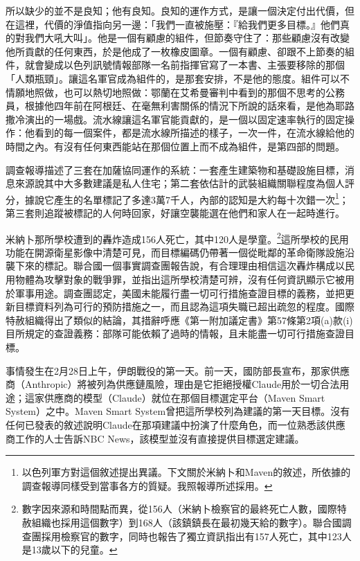 所以缺少的並不是良知；他有良知。良知的運作方式，是讓一個決定付出代價，但在這裡，代價的淨值指向另一邊：「我們一直被施壓：『給我們更多目標。』他們真的對我們大吼大叫」\autocite{abraham2024lavender}。他是一個有顧慮的組件，但節奏守住了：那些顧慮沒有改變他所貢獻的任何東西，於是他成了一枚橡皮圖章。一個有顧慮、卻跟不上節奏的組件，就會變成以色列訊號情報部隊一名前指揮官寫了一本書、主張要移除的那個「人類瓶頸」\autocite{ys2021humanmachine}。讓這名軍官成為組件的，是那套安排，不是他的態度。組件可以不情願地照做，也可以熱切地照做：鄂蘭在艾希曼審判中看到的那個不思考的公務員\autocite{arendt1963eichmann}，根據他四年前在阿根廷、在毫無利害關係的情況下所說的話來看，是他為耶路撒冷演出的一場戲\autocite{stangneth2014eichmann}。流水線讓這名軍官能貢獻的，是一個以固定速率執行的固定操作：他看到的每一個案件，都是流水線所描述的樣子，一次一件，在流水線給他的時間之內。有沒有任何東西能站在那個位置上而不成為組件，是第四部的問題。

調查報導描述了三套在加薩協同運作的系統：一套產生建築物和基礎設施目標，消息來源說其中大多數建議是私人住宅；第二套依估計的武裝組織關聯程度為個人評分，據說它產生的名單標記了多達3萬7千人，內部的認知是大約每十次錯一次\footnote{以色列軍方對這個敘述提出異議。下文關於米納卜和Maven的敘述，所依據的調查報導同樣受到當事各方的質疑。我照報導所述採用。}；第三套則追蹤被標記的人何時回家，好讓空襲能選在他們和家人在一起時進行。


米納卜那所學校遭到的轟炸造成156人死亡，其中120人是學童\autocite[第92段]{UNFFMIran2026}。\footnote{數字因來源和時間點而異，從156人（米納卜檢察官的最終死亡人數，國際特赦組織也採用這個數字）到168人（該鎮鎮長在最初幾天給的數字）。聯合國調查團採用檢察官的數字，同時也報告了獨立資訊指出有157人死亡，其中123人是13歲以下的兒童\autocite[第92–93段]{UNFFMIran2026}。}這所學校的民用功能在開源衛星影像中清楚可見，而目標編碼仍帶著一個從毗鄰的革命衛隊設施沿襲下來的標記。聯合國一個事實調查團報告說，有合理理由相信這次轟炸構成以民用物體為攻擊對象的戰爭罪\autocite{ohchr2026minabpress}，並指出這所學校清楚可辨，沒有任何資訊顯示它被用於軍事用途\autocite[第81–86、124–126段]{UNFFMIran2026}。調查團認定，美國未能履行盡一切可行措施查證目標的義務，並把更新目標資料列為可行的預防措施之一，而且認為這項失職已超出疏忽的程度\autocite[第124–125段]{UNFFMIran2026}。國際特赦組織得出了類似的結論，其措辭呼應《第一附加議定書》第57條第2項(a)款(i)目所規定的查證義務：部隊可能依賴了過時的情報，且未能盡一切可行措施查證目標\autocite{Amnesty2026Minab}。

事情發生在2月28日上午，伊朗戰役的第一天\autocite{Amnesty2026Minab,crs2026iranwar}。前一天，國防部長宣布，那家供應商（Anthropic）將被列為供應鏈風險，理由是它拒絕授權Claude用於一切合法用途；這家供應商的模型（Claude）就位在那個目標選定平台（Maven Smart System）之中\autocite{npr2026openai}。Maven Smart System曾把這所學校列為建議的第一天目標\autocite{livingstone2026maven,gizmodo2026minab}。沒有任何已發表的敘述說明Claude在那項建議中扮演了什麼角色，而一位熟悉該供應商工作的人士告訴NBC News，該模型並沒有直接提供目標選定建議\autocite{nbc2026targeting}。


